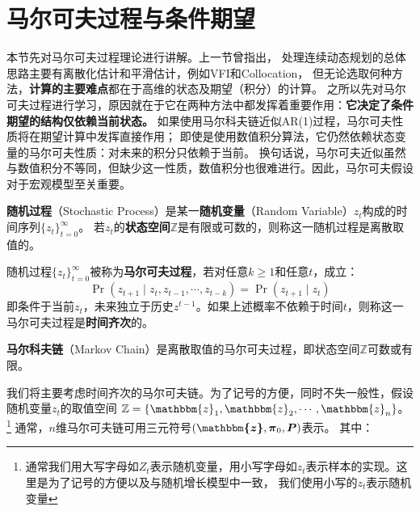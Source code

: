 
\section{马尔可夫过程与条件期望}    \label{sec-markov}

本节先对马尔可夫过程理论进行讲解。上一节曾指出，
处理连续动态规划的总体思路主要有离散化估计和平滑估计，例如VFI和Collocation，
但无论选取何种方法，\textbf{计算的主要难点}都在于高维的状态及期望（积分）的计算。
之所以先对马尔可夫过程进行学习，原因就在于它在两种方法中都发挥着重要作用：\textbf{它决定了条件期望的结构仅依赖当前状态。}
如果使用马尔科夫链近似AR(1)过程，马尔可夫性质将在期望计算中发挥直接作用；
即使是使用数值积分算法，它仍然依赖状态变量的马尔可夫性质：对未来的积分只依赖于当前。
换句话说，马尔可夫近似虽然与数值积分不等同，但缺少这一性质，数值积分也很难进行。因此，马尔可夫假设对于宏观模型至关重要。

\begin{definition}
    \textbf{随机过程}（Stochastic Process）是某一\textbf{随机变量}（Random Variable）$z_t$构成的时间序列$\{z_t\}_{t=0}^{\infty}$。
    若$z_t$的\textbf{状态空间}$\mathbb{Z}$是有限或可数的，则称这一随机过程是离散取值的。
\end{definition}

\begin{definition}
    随机过程$\{z_t\}_{t=0}^{\infty}$被称为\textbf{马尔可夫过程}，若对任意$k\geq1$和任意$t$，成立：
    \begin{equation*}
        \operatorname{Pr}\left(z_{t+1}\mid z_t,z_{t-1},\cdots,z_{t-k}\right)=\operatorname{Pr}\left(z_{t+1}\mid z_t\right)
    \end{equation*}
    即条件于当前$z_t$，未来独立于历史$z^{t-1}$。如果上述概率不依赖于时间$t$，则称这一马尔可夫过程是\textbf{时间齐次}的。
\end{definition}

\begin{definition}
    \textbf{马尔科夫链}（Markov Chain）是离散取值的马尔可夫过程，即状态空间$\mathbb{Z}$可数或有限。
\end{definition}

我们将主要考虑时间齐次的马尔可夫链。为了记号的方便，同时不失一般性，假设随机变量$z_t$的取值空间
$\mathbb{Z}=\{\mathbbm{z}_1,\mathbbm{z}_2,\cdots,\mathbbm{z}_n\}$。
\footnote{通常我们用大写字母如$Z_t$表示随机变量，用小写字母如$z_t$表示样本的实现。这里是为了记号的方便以及与随机增长模型中一致，
我们使用小写的$z_t$表示随机变量}
通常，$n$维马尔可夫链可用三元符号$\left(\boldsymbol{\mathbbm{z}},\boldsymbol{\pi}_0, \boldsymbol{P}\right)$表示。
其中：


